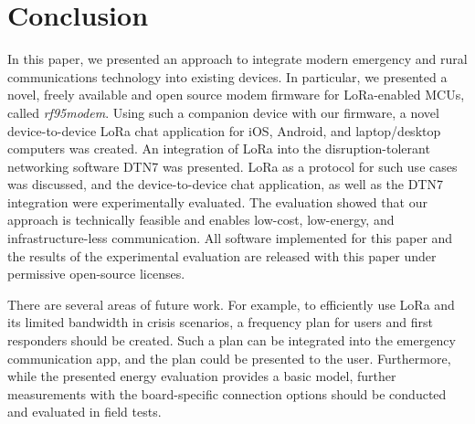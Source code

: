 \section{Conclusion}
\label{hoechst2020lora:sec:conclusion}

In this paper, we presented an approach to integrate modern emergency and rural communications technology into existing devices. 
In particular, we presented a novel, freely available and open source modem firmware for LoRa-enabled MCUs, called \textit{rf95modem}.
Using such a companion device with our firmware, a novel device-to-device LoRa chat application for iOS, Android, and laptop/desktop computers was created. 
An integration of LoRa into the disruption-tolerant networking software DTN7 was presented.
LoRa as a protocol for such use cases was discussed, and the device-to-device chat application, as well as the DTN7 integration were experimentally evaluated.
The evaluation showed that our approach is technically feasible and enables  low-cost, low-energy, and infrastructure-less communication.
All software implemented for this paper and the results of the experimental evaluation are released with this paper under permissive open-source licenses.

There are several areas of future work. For example, to efficiently use LoRa and its limited bandwidth in crisis scenarios, a frequency plan for users and first responders should be created.
Such a plan can be integrated into the emergency communication app, and the plan could be presented to the user.
Furthermore, while the presented energy evaluation provides a basic model, further measurements with the board-specific connection options should be conducted and evaluated in field tests.
